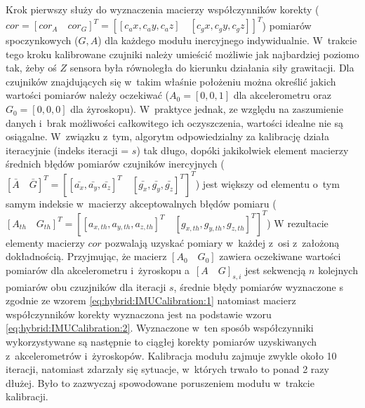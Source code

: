 Krok pierwszy służy do wyznaczenia macierzy współczynników korekty ($cor = [cor_A \quad cor_G]^T = [[c_ax,c_ay,c_az ]\quad[c_gx,c_gy,c_gz ]]^T $) pomiarów spoczynkowych ($G, A$) dla każdego modułu inercyjnego indywidualnie. W~trakcie tego kroku kalibrowane czujniki należy umieścić możliwie jak najbardziej poziomo tak, żeby oś $Z$ sensora była równoległa do kierunku działania siły grawitacji. Dla czujników znajdujących się w~takim właśnie położeniu można określić jakich wartości pomiarów należy oczekiwać ($A_0 = [0,0,1]$ dla akcelerometru oraz $G_0 = [0,0,0]$ dla żyroskopu). W~praktyce jednak, ze względu na zaszumienie danych i~brak możliwości całkowitego ich oczyszczenia, wartości idealne nie są osiągalne. W~związku z~tym, algorytm odpowiedzialny za kalibrację 
działa iteracyjnie (indeks iteracji = $s$) tak długo, dopóki jakikolwiek element macierzy średnich błędów pomiarów czujników inercyjnych ($[\bar{A}\quad \bar{G}]^T = [[\bar{a_x},\bar{a_y},\bar{a_z}]^T\quad[\bar{g_x},\bar{g_y},\bar{g_z}]^T]^T$)
jest większy od elementu o~tym samym indeksie w~macierzy akceptowalnych błędów pomiaru ($[A_{th}\quad G_{th}]^T = [[a_{x,th},a_{y,th},a_{z,th}]^T\quad[g_{x,th},g_{y,th},g_{z,th}]^T]^T $)
W rezultacie elementy macierzy $cor$ pozwalają uzyskać pomiary w~każdej z~osi z~założoną dokładnością.
Przyjmując, że macierz $[A_0\quad G_0]$ zawiera oczekiwane wartości pomiarów dla akcelerometru i~żyroskopu a~$[A\quad G]_{s,i}$ jest sekwencją $n$ kolejnych pomiarów obu czuzjników dla iteracji $s$, średnie błędy pomiarów wyznaczone s zgodnie ze wzorem \ref{eq:hybrid:IMUCalibration:1} natomiast macierz współczynników korekty wyznaczona jest na podstawie wzoru \ref{eq:hybrid:IMUCalibration:2}. Wyznaczone w~ten sposób współczynniki wykorzystywane są następnie to ciągłej korekty pomiarów uzyskiwanych z~akcelerometrów i~żyroskopów. Kalibracja modułu zajmuje zwykle około 10 iteracji, natomiast zdarzały się sytuacje, w~których trwało to ponad 2 razy dłużej. Było to zazwyczaj spowodowane poruszeniem modułu w~trakcie kalibracji.

